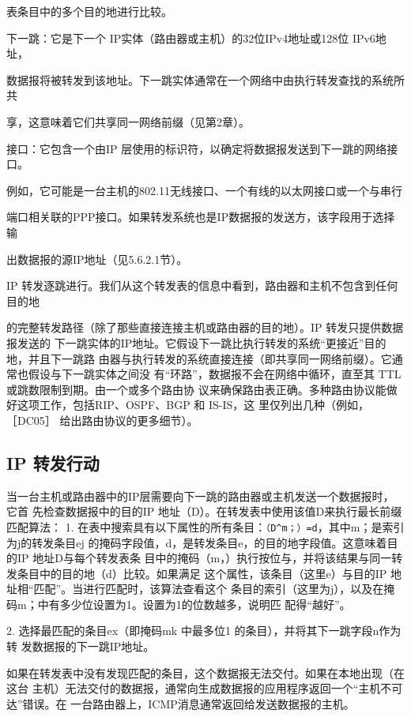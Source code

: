 表条目中的多个目的地进行比较。

 下一跳：它是下一个 IP实体（路由器或主机）的32位IPv4地址或128位 IPv6地址，

数据报将被转发到该地址。下一跳实体通常在一个网络中由执行转发查找的系统所共

享，这意味着它们共享同一网络前缀（见第2章）。

接口：它包含一个由IP 层使用的标识符，以确定将数据报发送到下一跳的网络接口。

例如，它可能是一台主机的802.11无线接口、一个有线的以太网接口或一个与串行

端口相关联的PPP接口。如果转发系统也是IP数据报的发送方，该字段用于选择输

出数据报的源IP地址（见5.6.2.1节）。

IP 转发逐跳进行。我们从这个转发表的信息中看到，路由器和主机不包含到任何目的地

的完整转发路径（除了那些直接连接主机或路由器的目的地）。IP 转发只提供数据报发送的
下一跳实体的IP地址。它假设下一跳比执行转发的系统“更接近”目的地，并且下一跳路
由器与执行转发的系统直接连接（即共享同一网络前缀）。它通常也假设与下一跳实体之间没
有“环路”，数据报不会在网络中循环，直至其 TTL 或跳数限制到期。由一个或多个路由协
议来确保路由表正确。多种路由协议能做好这项工作，包括RIP、OSPF、BGP 和 IS-IS，这
里仅列出几种（例如，［DC05］ 给出路由协议的更多细节）。

\subsection{IP 转发行动}
当一台主机或路由器中的IP层需要向下一跳的路由器或主机发送一个数据报时，它首
先检查数据报中的目的IP 地址（D）。在转发表中使用该值D来执行最长前缀匹配算法：
1. 在表中搜索具有以下属性的所有条目：\verb|（D^m；）=d|，其中m；是索引为j的转发条目ej
的掩码字段值，d，是转发条目e，的目的地字段值。这意味着目的IP 地址D与每个转发表条
目中的掩码（m，）执行按位与，并将该结果与同一转发条目中的目的地（d）比较。如果满足
这个属性，该条目（这里e）与目的IP 地址相“匹配”。当进行匹配时，该算法查看这个
条目的索引（这里为j），以及在掩码m；中有多少位设置为1。设置为1的位数越多，说明匹
配得“越好”。

2. 选择最匹配的条目ex（即掩码mk 中最多位1 的条目），并将其下一跳字段n作为转
发数据报的下一跳IP地址。

如果在转发表中没有发现匹配的条目，这个数据报无法交付。如果在本地出现（在这台
主机）无法交付的数据报，通常向生成数据报的应用程序返回一个“主机不可达”错误。在
一台路由器上，ICMP消息通常返回给发送数据报的主机。

